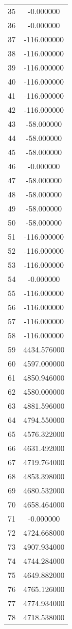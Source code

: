 \documentclass[12pt]{article}
\begin{document}
\begin{longtable}{@{}cc@{}}
35 & -0.000000 \\
36 & -0.000000 \\
37 & -116.000000 \\
38 & -116.000000 \\
39 & -116.000000 \\
40 & -116.000000 \\
41 & -116.000000 \\
42 & -116.000000 \\
43 & -58.000000 \\
44 & -58.000000 \\
45 & -58.000000 \\
46 & -0.000000 \\
47 & -58.000000 \\
48 & -58.000000 \\
49 & -58.000000 \\
50 & -58.000000 \\
51 & -116.000000 \\
52 & -116.000000 \\
53 & -116.000000 \\
54 & -0.000000 \\
55 & -116.000000 \\
56 & -116.000000 \\
57 & -116.000000 \\
58 & -116.000000 \\
59 & 4434.576000 \\
60 & 4597.000000 \\
61 & 4850.946000 \\
62 & 4580.000000 \\
63 & 4881.596000 \\
64 & 4794.550000 \\
65 & 4576.322000 \\
66 & 4631.492000 \\
67 & 4719.764000 \\
68 & 4853.398000 \\
69 & 4680.532000 \\
70 & 4658.464000 \\
71 & -0.000000 \\
72 & 4724.668000 \\
73 & 4907.934000 \\
74 & 4744.284000 \\
75 & 4649.882000 \\
76 & 4765.126000 \\
77 & 4774.934000 \\
78 & 4718.538000 \\

\end{longtable}
\end{document}
